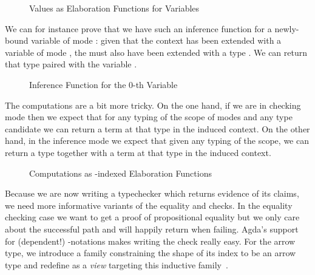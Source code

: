 \begin{figure}[h!]
\caption{Values as Elaboration Functions for Variables\label{fig:elabvalues}}
\end{figure}

We can for instance prove that we have such an inference function for a newly-bound
variable of mode : given that the context has been extended with a variable
of mode , the  must also have been extended with a type .
We can return that type paired with the variable .

\begin{figure}[h]
\caption{Inference Function for the 0-th Variable\label{fig:elabvar0}}
\end{figure}

The computations are a bit more tricky. On the one hand, if we are in checking mode
then we expect that for any typing of the scope of modes and any type candidate we
can  return a term at that type in the induced context. On the other hand,
in the inference mode we expect that given any typing of the scope, we can 
return a type together with a term at that type in the induced context.

\begin{figure}[h]
\caption{Computations as -indexed Elaboration Functions\label{fig:elabcomputations}}
\end{figure}

Because we are now writing a typechecker which returns evidence of its claims, we need
more informative variants of the equality and  checks. In the equality
checking case we want to get a proof of propositional equality but we only care
about the successful path and will happily return  when failing.
Agda's support for (dependent!) -notations makes writing the check
really easy. For the arrow type, we introduce a family  constraining the
shape of its index to be an arrow type and redefine  as a \emph{view} targeting
this inductive family~\cite{DBLP:conf/popl/Wadler87,DBLP:journals/jfp/McBrideM04}.

